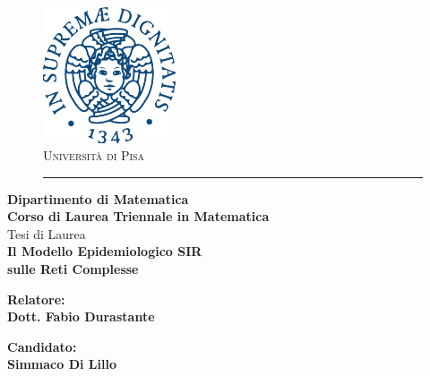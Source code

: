 \documentclass[12pt,a4paper,twoside]{report}
\begin{document}
\begin{titlepage}
\begin{figure}[t]
	\centering\includegraphics[width=0.35\textwidth]{figure/stemma_unipi.png}\\[1em]
	{\LARGE \textsc{Università di Pisa}}\\
	\vspace*{-0.5em}\rule{0.6\textwidth}{0.4pt}
\end{figure}
\begin{center}
	\textbf{ Dipartimento di Matematica\\ Corso di Laurea Triennale in Matematica \\}
	\vspace{15mm}
	{\centering Tesi di Laurea}\\[1em]
    {\LARGE{\bf Il Modello Epidemiologico SIR \\ sulle Reti Complesse}}\\
	\vspace{3mm}
\end{center}

\vspace{36mm}

\begin{minipage}[t]{0.47\textwidth}
	{\large{\bf Relatore:\\Dott. Fabio Durastante}}
\end{minipage}\hfill\begin{minipage}[t]{0.47\textwidth}\raggedleft
	{\large{\bf Candidato:\\Simmaco Di Lillo\\ }}
\end{minipage}

\vfill
\centering{\rule{0.5\textwidth}{0.4pt}}\\

\end{titlepage}

\begin{abstract}
\cite{KISS}
\end{abstract}
\end{document}
